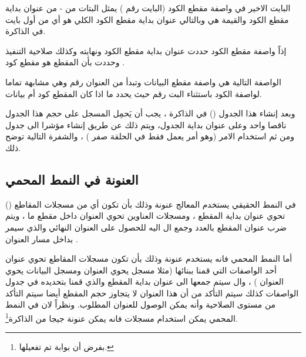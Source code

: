 \documentclass[document.tex]{subfiles}
\begin{document}
البايت الاخير في واصفة مقطع الكود (البايت رقم ) يمثل البتات من - من عنوان بداية مقطع الكود والقيمة هي  وبالتالي عنوان بداية مقطع الكود الكلي هو  أي من أول بايت في الذاكرة.

إذاً واصفة مقطع الكود   حددت عنوان بداية مقطع الكود ونهايته وكذلك صلاحية التنفيذ وحددت بأن المقطع هو مقطع كود .

الواصفة التالية هي واصفة مقطع البيانات   وتبدأ من العنوان رقم  وهي مشابهة تماما لواصفة الكود باستثناء البت رقم  حيث يحدد ما اذا كان المقطع كود أم بيانات.

وبعد إنشاء هذا الجدول () في الذاكرة ، يجب أن يَحمِل المسجل   على حجم هذا الجدول ناقصا واحد وعلى عنوان بداية الجدول، ويتم ذلك عن طريق إنشاء مؤشرا الى جدول  ومن ثم  استخدام الامر  (وهو أمر يعمل فقط في الحلقة صفر ) ، والشفرة التالية توضح ذلك.

\begin{english}
\lstset{numberstyle=\tiny,numbers=left,stepnumber=1,numbersep=5pt,tabsize=2,extendedchars=true,breaklines=true,frame=b,showspaces=false, showtabs=false,xleftmargin=10pt,framexleftmargin=10pt,framexrightmargin=5pt,framexbottommargin=4pt,showstringspaces=false,language=[x86masm]Assembler}


\end{english}

\subsection{العنونة في النمط المحمي }
في النمط الحقيقي يستخدم المعالج عنونة  وذلك بأن تكون أي من مسجلات المقاطع () تحوي عنوان بداية المقطع ، ومسجلات العناوين تحوي العنوان داخل مقطع ما ، ويتم ضرب عنوان المقطع بالعدد  وجمع ال  اليه للحصول على العنوان النهائي والذي سيمر بداخل مسار العنوان .

أما النمط المحمي  فانه يستخدم عنونة  وذلك بأن تكون مسجلات المقاطع تحوي عنوان أحد الواصفات التي قمنا ببنائها (مثلا مسجل  يحوي العنوان  ومسجل البيانات  يحوي العنوان ) ، وال  سيتم جمعها الى عنوان بداية المقطع   والذي قمنا بتحديده في جدول الواصفات كذلك سيتم التأكد من أن هذا العنوان لا يتجاوز حجم المقطع  أيضا سيتم التأكد من مستوى الصلاحية وأنه يمكن الوصول للعنوان المطلوب. ونظراً لان في النمط المحمي يمكن استخدام مسجلات  فانه يمكن عنونة  جيجا من الذاكرة\footnote{بفرض أن بوابة  تم تفعيلها.}.
\end{document}
